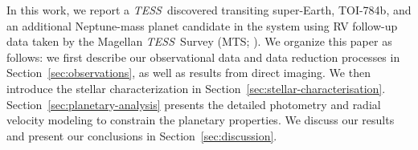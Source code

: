 \documentclass[twocolumn]{aastex631}
\newcommand{\kepler}{\textit{Kepler}\ }
\newcommand{\tess}{\textit{TESS}\ }
\begin{document}


In this work, we report a \tess discovered transiting super-Earth, TOI-784b, and an additional Neptune-mass planet candidate in the system using RV follow-up data taken by the Magellan \tess Survey (MTS; \citealt{Teske2021}). We organize this paper as follows: we first describe our observational data and data reduction processes in Section~\ref{sec:observations}, as well as results from direct imaging. We then introduce the stellar characterization in Section~\ref{sec:stellar-characterisation}. Section~\ref{sec:planetary-analysis} presents the detailed photometry and radial velocity modeling to constrain the planetary properties. We discuss our results and present our conclusions in Section~\ref{sec:discussion}. 
\end{document}
